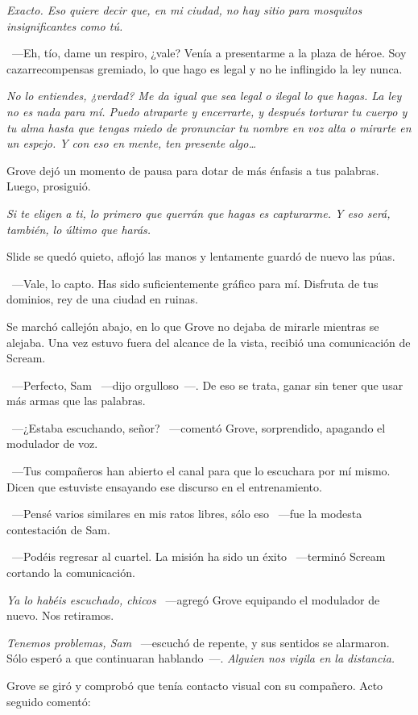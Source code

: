 \emph{Exacto. Eso quiere decir que, en mi ciudad, no hay sitio para mosquitos insignificantes como tú.}

~---Eh, tío, dame un respiro, ¿vale? Venía a presentarme a la plaza de héroe. Soy cazarrecompensas gremiado, lo que hago es legal y no he inflingido la ley nunca.

\emph{No lo entiendes, ¿verdad? Me da igual que sea legal o ilegal lo que hagas. La ley no es nada para mí. Puedo atraparte y encerrarte, y después torturar tu cuerpo y tu alma hasta que tengas miedo de pronunciar tu nombre en voz alta o mirarte en un espejo. Y con eso en mente, ten presente algo\dots}

Grove dejó un momento de pausa para dotar de más énfasis a tus palabras. Luego, prosiguió.

\emph{Si te eligen a ti, lo primero que querrán que hagas es capturarme. Y eso será, también, lo último que harás.}

Slide se quedó quieto, aflojó las manos y lentamente guardó de nuevo las púas.

~---Vale, lo capto. Has sido suficientemente gráfico para mí. Disfruta de tus dominios, rey de una ciudad en ruinas.

Se marchó callejón abajo, en lo que Grove no dejaba de mirarle mientras se alejaba. Una vez estuvo fuera del alcance de la vista, recibió una comunicación de Scream.

~---Perfecto, Sam ~---dijo orgulloso~---. De eso se trata, ganar sin tener que usar más armas que las palabras.

~---¿Estaba escuchando, señor? ~---comentó Grove, sorprendido, apagando el modulador de voz.

~---Tus compañeros han abierto el canal para que lo escuchara por mí mismo. Dicen que estuviste ensayando ese discurso en el entrenamiento.

~---Pensé varios similares en mis ratos libres, sólo eso ~---fue la modesta contestación de Sam.

~---Podéis regresar al cuartel. La misión ha sido un éxito ~---terminó Scream cortando la comunicación.

\emph{Ya lo habéis escuchado, chicos} ~---agregó Grove equipando el modulador de nuevo. Nos retiramos.

\emph{Tenemos problemas, Sam} ~---escuchó de repente, y sus sentidos se alarmaron. Sólo esperó a que continuaran hablando~---. \emph{Alguien nos vigila en la distancia.}

Grove se giró y comprobó que tenía contacto visual con su compañero. Acto seguido comentó:


